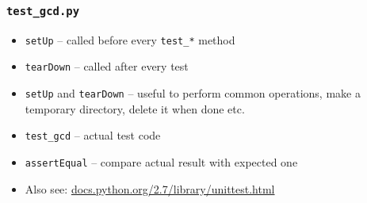 \documentclass[12pt,presentation]{beamer}
\begin{document}
\begin{frame}[fragile]
  \frametitle{\texttt{test\_gcd.py}}
  \begin{itemize}
  \item \texttt{setUp} -- called before every \texttt{test\_*} method
  \item \texttt{tearDown} -- called after every test
  \item \texttt{setUp} and \texttt{tearDown} -- useful to perform common
      operations, make a temporary directory, delete it when done etc.
  \item \texttt{test\_gcd} -- actual test code
  \item \texttt{assertEqual} -- compare actual result with expected one
  \item Also see: \url{docs.python.org/2.7/library/unittest.html}
  \end{itemize}
\end{frame}
\end{document}
